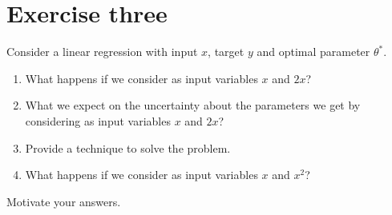 \section{Exercise three}

Consider a linear regression with input $x$, target $y$ and optimal parameter $\theta^\ast$.
\begin{enumerate}
    \item What happens if we consider as input variables $x$ and $2x$?
    \item What we expect on the uncertainty about the parameters we get by considering as input variables $x$ and $2x$?
    \item Provide a technique to solve the problem.
    \item What happens if we consider as input variables $x$ and $x^2$?
\end{enumerate}
Motivate your answers.

